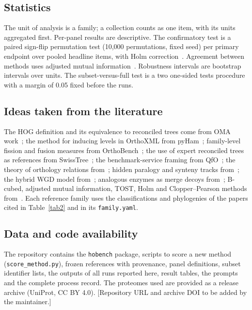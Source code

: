 \subsection*{Statistics}
The unit of analysis is a family; a collection counts as one item, with its units aggregated first. Per-panel results
are descriptive. The confirmatory test is a paired sign-flip permutation test (10,000 permutations, fixed seed) per
primary endpoint over pooled headline items, with Holm correction~\cite{holm1979}. Agreement between methods uses
adjusted mutual information~\cite{vinh2010ami}. Robustness intervals are bootstrap intervals over units. The
subset-versus-full test is a two one-sided tests procedure with a margin of 0.05 fixed before the runs.

\subsection*{Ideas taken from the literature}
The HOG definition and its equivalence to reconciled trees come from OMA work~\cite{altenhoff2013hogs,train2017gethogs};
the method for inducing levels in OrthoXML from pyHam~\cite{train2019pyham}; family-level fission and fusion measures from
OrthoBench~\cite{trachana2011orthobench,emms2020orthobench}; the use of expert reconciled trees as references from
SwissTree~\cite{boeckmann2011swisstree}; the benchmark-service framing from QfO~\cite{altenhoff2016qfo,nevers2022qfo};
the theory of orthology relations from~\cite{hellmuth2013cograph,lafond2014orthology}; hidden paralogy and synteny
tracks from~\cite{byrne2005ygob,scannell2006,scannell2007}; the hybrid WGD model from~\cite{marcethouben2015};
analogous enzymes as merge decoys from~\cite{omelchenko2010}; B-cubed, adjusted mutual information, TOST, Holm and
Clopper--Pearson methods from~\cite{amigo2009bcubed,vinh2010ami,schuirmann1987tost,holm1979,clopper1934}. Each reference
family uses the classifications and phylogenies of the papers cited in Table~\ref{tab2} and in its \texttt{family.yaml}.

\subsection*{Data and code availability}
The repository contains the \texttt{hobench} package, scripts to score a new method (\texttt{score\_method.py}),
frozen references with provenance, panel definitions, subset identifier lists, the outputs of all runs reported here,
result tables, the prompts and the complete process record. The proteomes used are provided as a release archive
(UniProt, CC BY 4.0). [Repository URL and archive DOI to be added by the maintainer.]

